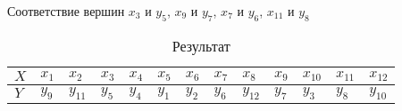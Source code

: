 \documentclass[a4paper,12pt]{article}
\begin{document}
    Соответствие вершин $x_3$ и $y_5$, $x_9$ и $y_7$, $x_7$ и $y_6$, $x_{11}$ и $y_8$

    \begin{table}[H]
        \centering
        \caption{Результат}
        \begin{tabular}{l*{12}{|l}}
            $X$&$x_1$&$x_2$&$x_3$&$x_4$&$x_5$&$x_6$&$x_7$&$x_8$&$x_9$&$x_{10}$&$x_{11}$&$x_{12}$\\
            \hline
            $Y$&$y_9$&$y_{11}$&$y_5$&$y_4$&$y_1$&$y_2$&$y_6$&$y_{12}$&$y_7$&$y_3$&$y_8$&$y_{10}$\\
        \end{tabular}
    \end{table}


    \label{LastPage}
\end{document}
